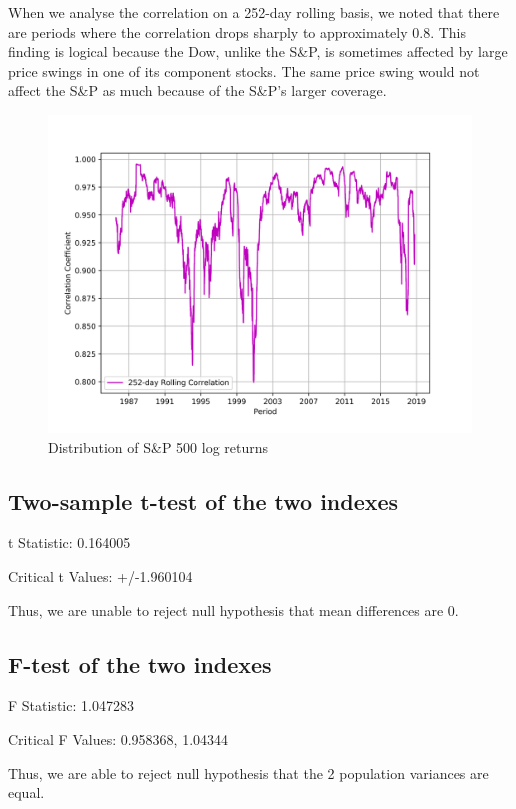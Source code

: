 \documentclass[a4paper]{article}
\begin{document}
When we analyse the correlation on a 252-day rolling basis, we noted that there are periods where the correlation drops sharply to approximately 0.8. This finding is logical because the Dow, unlike the S\&P, is sometimes affected by large price swings in one of its component stocks. The same price swing would not affect the S\&P as much because of the S\&P’s larger coverage. 

\begin{figure}[h!]
	\centering
	\includegraphics[width=0.8\linewidth]{correlation.png}
	\caption{Distribution of S\&P 500 log returns}
\end{figure}

\newpage
\subsection{Two-sample t-test of the two indexes}
\begin{flushleft}
t Statistic: 0.164005

Critical t Values: +/-1.960104

Thus, we are unable to reject null hypothesis that mean differences are 0.
\end{flushleft}

\subsection{F-test of the two indexes}
\begin{flushleft}
F Statistic: 1.047283

Critical F Values: 0.958368, 1.04344

Thus, we are able to reject null hypothesis that the 2 population variances are equal.
\end{flushleft}


\end{document}
